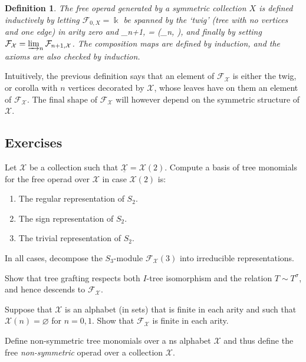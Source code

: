 \documentclass[fleqn, a4paper, twoside]{article}
\makeatletter
\newcommand{\0}{\langle 0\rangle}
\newcommand{\XX}{\mathcal{X}}
\newcommand{\FF}{\mathcal{F}}
\newenvironment{tenumerate}{
 \begin{enumerate}
  \setlength{\itemsep}{0pt}
  \setlength{\parskip}{0pt}
}{\end{enumerate}}
\let\[\@undefined
\DeclareRobustCommand{\[}{\begin{equation}}%
\let\]\@undefined
\DeclareRobustCommand{\]}{\end{equation}}%
\theoremstyle{mytheorem}
\theoremstyle{introthm}
\theoremstyle{mydefinition}
\newtheorem{definition}[theorem]{Definition}
\theoremstyle{mydefinition2}
\theoremstyle{plain} %
\newcommand{\?}{\,?\,}
\newcommand{\kk}{\Bbbk}
\theoremstyle{mytheorem}
\theoremstyle{plain} %
\makeatother
\begin{document}
\begin{definition}
The free operad generated by a symmetric
collection $X$ is defined inductively by
letting  $\FF_{0,X}=\kk$ be spanned
by the `twig' (tree with no vertices and one edge)
in arity zero and
\[ \FF_{n+1,\XX} = \kk\oplus (\XX\circ  \FF_{n,\XX} ), \]
and finally by setting
$\FF_\XX = \varinjlim_n \FF_{n+1,\XX}$.
The composition maps are defined by induction,
and the axioms are also checked by induction.
\end{definition}

Intuitively, the previous definition says that an element of
$\FF_\XX$ is either the twig, or corolla
with $n$ vertices decorated by $\XX$, whose leaves
have on them an element of $\FF_\XX$. The
final shape of $\FF_\XX$ will however
depend on the symmetric structure of $ \XX$. 
 \subsection{Exercises}


 
 \begin{question}
Let $\XX$ be a collection such that $\underline{\XX} = 
\XX(2)$. Compute a basis of tree monomials 
for the free operad over
$\XX$ in case $\XX(2)$ is:
\begin{tenumerate}
\item The regular representation of $S_2$.
\item The sign representation of $S_2$.
\item The trivial representation of $S_2$. 
\end{tenumerate} 
In all cases, decompose the $S_3$-module $\mathcal{F}_\XX(3)$
into irreducible representations.
\end{question}


\begin{question}\label{ex:grafting}
Show that tree grafting respects both $I$-tree
isomorphism and the relation $T\sim T^\sigma$,
and hence descends to $\FF_\XX$.
\end{question}

\begin{question}
Suppose that $\XX$ is an alphabet (in sets) that is
finite in each arity and such that $\XX(n) = \varnothing$
for $n=0,1$. Show that $\mathcal{F}_\XX$ is finite
in each arity. 
\end{question}
 
\begin{question}
Define non-symmetric tree monomials over a ns alphabet
$\XX$ and thus define the free \emph{non-symmetric}
operad over a collection $\XX$.
\end{question}
\end{document}
